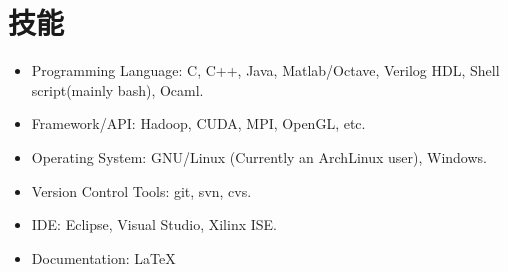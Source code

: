 \documentclass[letterpaper]{article}
\begin{document}
\section*{技能}
\begin{itemize}
\item Programming Language: C, C++, Java, Matlab/Octave, Verilog HDL, Shell script(mainly bash), Ocaml.
\item Framework/API: Hadoop, CUDA, MPI, OpenGL, etc.
\item Operating System: GNU/Linux (Currently an ArchLinux user), Windows.
\item Version Control Tools: git, svn, cvs.
\item IDE: Eclipse, Visual Studio, Xilinx ISE.
\item Documentation: \LaTeX
\end{itemize}
\end{document}
